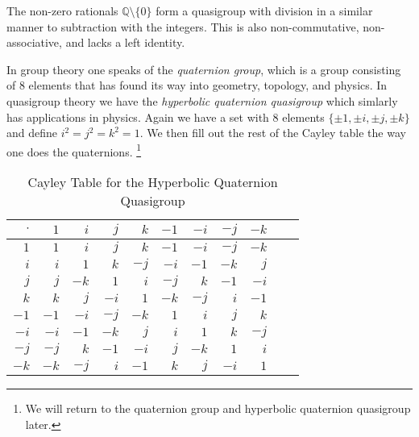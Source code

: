         \begin{example}
            The non-zero rationals $\mathbb{Q}\setminus\{0\}$ form a quasigroup
            with division in a similar manner to subtraction with the integers.
            This is also non-commutative, non-associative, and lacks a left
            identity.
        \end{example}
        \begin{example}
            In group theory one speaks of the \textit{quaternion group}, which
            is a group consisting of 8 elements that has found its way into
            geometry, topology, and physics. In quasigroup theory we have the
            \textit{hyperbolic quaternion quasigroup} which simlarly has
            applications in physics. Again we have a set with 8 elements
            $\{\pm{1},\pm{i},\pm{j},\pm{k}\}$ and define
            $i^{2}=j^{2}=k^{2}=1$. We then fill out the rest of the
            Cayley table the way one does the quaternions.%
            \footnote{%
                We will return to the quaternion group and hyperbolic quaternion
                quasigroup later.
            }
        \end{example}
        \begin{table}[H]
            \centering
            \captionsetup{type=table}
            \begin{tabular}{r|rrrrrrrrrr}
                $\cdot$&$1$&$i$&$j$&$k$
                    &$\minus{1}$&$\minus{i}$&$\minus{j}$&$\minus{k}$\\
                \hline
                $1$&$1$&$i$&$j$&$k$        
                    &$\minus{1}$&$\minus{i}$&$\minus{j}$&$\minus{k}$\\
                $i$&$i$&$1$&$k$&$\minus{j}$
                    &$\minus{i}$&$\minus{1}$&$\minus{k}$&$j$\\
                $j$&$j$&$\minus{k}$&$1$&$i$
                    &$\minus{j}$&$k$&$\minus{1}$&$\minus{i}$\\
                $k$&$k$&$j$&$\minus{i}$&$1$
                    &$\minus{k}$&$\minus{j}$&$i$&$\minus{1}$\\
                $\minus{1}$&$\minus{1}$&$\minus{i}$&$\minus{j}$&$\minus{k}$&
                    $1$&$i$&$j$&$k$\\
                $\minus{i}$&$\minus{i}$&$\minus{1}$&$\minus{k}$&$j$&
                    $i$&$1$&$k$&$\minus{j}$\\
                $\minus{j}$&$\minus{j}$&$k$&$\minus{1}$&$\minus{i}$&
                    $j$&$\minus{k}$&$1$&$i$\\
                $\minus{k}$&$\minus{k}$&$\minus{j}$&$i$&$\minus{1}$&
                    $k$&$j$&$\minus{i}$&$1$
            \end{tabular}
            \caption{Cayley Table for the Hyperbolic Quaternion Quasigroup}
            \label{tab:Cayley_Table_Hyperbolic_Quaternions}
        \end{table}
